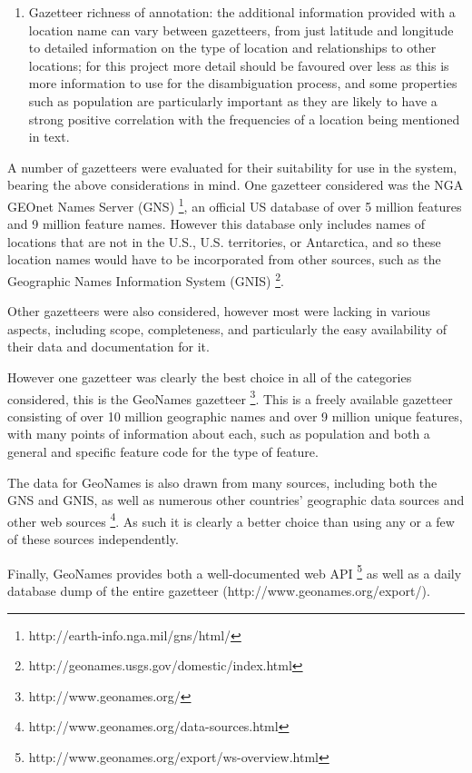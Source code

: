 \documentclass[12pt, a4paper]{report}
\begin{document}
\begin{enumerate}
{	}
	\item { Gazetteer richness of annotation: the additional information provided with a location name can vary between gazetteers, from just latitude and longitude to detailed information on the type of location and relationships to other locations; for this project more detail should be favoured over less as this is more information to use for the disambiguation process, and some properties such as population are particularly important as they are likely to have a strong positive correlation with the frequencies of a location being mentioned in text.
	}
\end{enumerate}


A number of gazetteers were evaluated for their suitability for use in the system, bearing the above considerations in mind. One gazetteer considered was the NGA GEOnet Names Server (GNS) \footnote{http://earth-info.nga.mil/gns/html/}, an official US database of over 5 million features and 9 million feature names. However this database only includes names of locations that are not in the U.S., U.S. territories, or Antarctica, and so these location names would have to be incorporated from other sources, such as the  Geographic Names Information System (GNIS) \footnote{http://geonames.usgs.gov/domestic/index.html}.

Other gazetteers were also considered, however most were lacking in various aspects, including scope, completeness, and particularly the easy availability of their data and documentation for it.

However one gazetteer was clearly the best choice in all of the categories considered, this is the GeoNames gazetteer \footnote{http://www.geonames.org/}. This is a freely available gazetteer consisting of over 10 million geographic names and over 9 million unique features, with many points of information about each, such as population and both a general and specific feature code for the type of feature.

The data for GeoNames is also drawn from many sources, including both the GNS and GNIS, as well as numerous other countries' geographic data sources and other web sources \footnote{http://www.geonames.org/data-sources.html}. As such it is clearly a better choice than using any or a few of these sources independently.

Finally, GeoNames provides both a well-documented web API \footnote{http://www.geonames.org/export/ws-overview.html} as well as a daily database dump of the entire gazetteer (http://www.geonames.org/export/).
\end{document}
